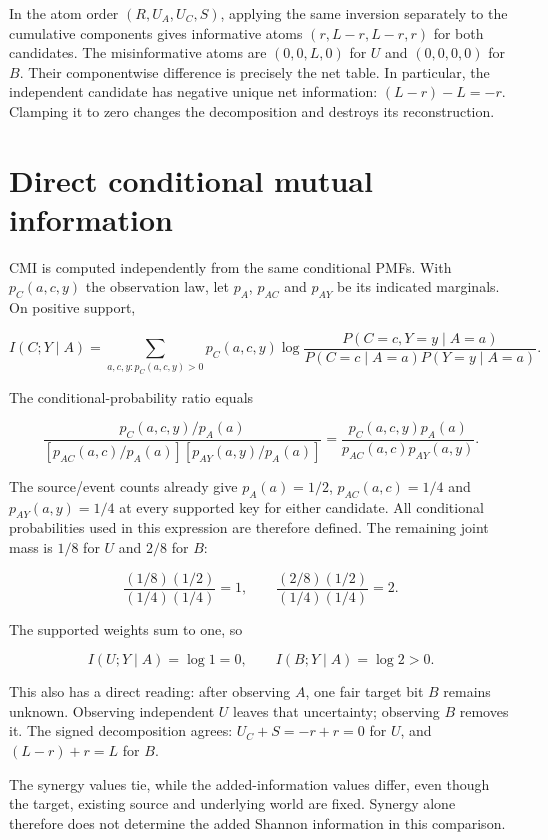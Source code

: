 In the atom order \((R,U_A,U_C,S)\), applying the same inversion separately to the cumulative components gives informative atoms \((r,L-r,L-r,r)\) for both candidates. The misinformative atoms are \((0,0,L,0)\) for \(U\) and \((0,0,0,0)\) for \(B\). Their componentwise difference is precisely the net table. In particular, the independent candidate has negative unique net information: \((L-r)-L=-r\). Clamping it to zero changes the decomposition and destroys its reconstruction.

\par{}

\section{Direct conditional mutual information}\label{direct-conditional-mutual-information}

CMI is computed independently from the same conditional PMFs. With \(p_C(a,c,y)\) the observation law, let \(p_A\), \(p_{AC}\) and \(p_{AY}\) be its indicated marginals. On positive support,

\[
I(C;Y\mid A)=\sum_{a,c,y:p_C(a,c,y)>0}
p_C(a,c,y)\log
\frac{P(C=c,Y=y\mid A=a)}
{P(C=c\mid A=a)P(Y=y\mid A=a)}.
\]

The conditional-probability ratio equals

\[
\frac{p_C(a,c,y)/p_A(a)}
{[p_{AC}(a,c)/p_A(a)][p_{AY}(a,y)/p_A(a)]}
=\frac{p_C(a,c,y)p_A(a)}{p_{AC}(a,c)p_{AY}(a,y)}.
\]

The source/event counts already give \(p_A(a)=1/2\), \(p_{AC}(a,c)=1/4\) and \(p_{AY}(a,y)=1/4\) at every supported key for either candidate. All conditional probabilities used in this expression are therefore defined. The remaining joint mass is \(1/8\) for \(U\) and \(2/8\) for \(B\):

\[
\frac{(1/8)(1/2)}{(1/4)(1/4)}=1,
\qquad
\frac{(2/8)(1/2)}{(1/4)(1/4)}=2.
\]

The supported weights sum to one, so

\[
I(U;Y\mid A)=\log 1=0,\qquad
I(B;Y\mid A)=\log 2>0.
\]

This also has a direct reading: after observing \(A\), one fair target bit \(B\) remains unknown. Observing independent \(U\) leaves that uncertainty; observing \(B\) removes it. The signed decomposition agrees: \(U_C+S=-r+r=0\) for \(U\), and \((L-r)+r=L\) for \(B\).

The synergy values tie, while the added-information values differ, even though the target, existing source and underlying world are fixed. Synergy alone therefore does not determine the added Shannon information in this comparison.

